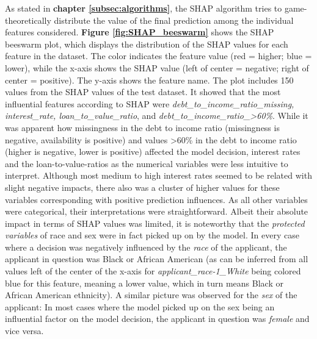 As stated in \textbf{chapter \ref{subsec:algorithms}}, the SHAP algorithm tries to game-theoretically distribute the value of the final prediction among the individual features considered.
\textbf{Figure \ref{fig:SHAP_beeswarm}} shows the SHAP beeswarm plot, which displays the distribution of the SHAP values for each feature in the dataset. The color indicates the feature value (red = higher; blue = lower), while the x-axis shows the SHAP value (left of center = negative; right of center = positive). The y-axis shows the feature name. The plot includes 150 values from the SHAP values of the test dataset.
It showed that the most influential features according to SHAP were \textit{debt\_to\_income\_ratio\_missing, interest\_rate, loan\_to\_value\_ratio}, and \textit{debt\_to\_income\_ratio\_>60\%}.
While it was apparent how missingness in the debt to income ratio (missingness is negative, availability is positive) and values >60\% in the debt to income ratio (higher is negative, lower is positive) affected the model decision, interest rates and the loan-to-value-ratios as the numerical variables were less intuitive to interpret.
Although most medium to high interest rates seemed to be related with slight negative impacts, there also was a cluster of higher values for these variables corresponding with positive prediction influences.
As all other variables were categorical, their interpretations were straightforward. Albeit their absolute impact in terms of SHAP values was limited, it is noteworthy that the \textit{protected variables} of race and sex were in fact picked up on by the model.
In every case where a decision was negatively influenced by the \textit{race} of the applicant, the applicant in question was Black or African American (as can be inferred from all values left of the center of the x-axis for \textit{applicant\_race-1\_White} being colored blue for this feature, meaning a lower value, which in turn means Black or African American ethnicity).
A similar picture was observed for the \textit{sex} of the applicant: In most cases where the model picked up on the sex being an influential factor on the model decision, the applicant in question was \textit{female} and vice versa.

